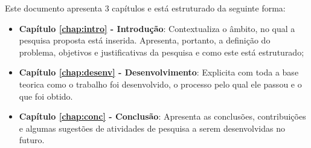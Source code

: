 Este documento apresenta $3$ capítulos e está estruturado da seguinte forma:

\begin{itemize}

  \item \textbf{Capítulo \ref{chap:intro} - Introdução}: Contextualiza o âmbito, no qual a pesquisa proposta está inserida. Apresenta, portanto, a definição do problema, objetivos e justificativas da pesquisa e como este \thetypeworkthree está estruturado;
  \item \textbf{Capítulo \ref{chap:desenv} - Desenvolvimento}: Explicita com toda a base teorica como o trabalho foi desenvolvido, o processo pelo qual ele passou e o que foi obtido.
  \item \textbf{Capítulo \ref{chap:conc} - Conclusão}: Apresenta as conclusões, contribuições e algumas sugestões de atividades de pesquisa a serem desenvolvidas no futuro.

\end{itemize}
